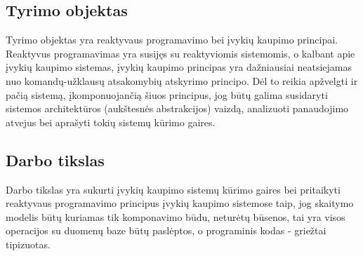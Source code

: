 \subsection{Tyrimo objektas}

    Tyrimo objektas yra reaktyvaus programavimo bei įvykių kaupimo principai. Reaktyvus programavimas yra susijęs su reaktyviomis sistemomis, o kalbant apie įvykių kaupimo sistemas, įvykių kaupimo principas yra dažniausiai neatsiejamas nuo komandų-užklausų atsakomybių atskyrimo principo. Dėl to reikia apžvelgti ir pačią sistemą, įkomponuojančią šiuos principus, jog būtų galima susidaryti sistemos architektūros (aukštesnės abstrakcijos) vaizdą, analizuoti panaudojimo atvejus bei aprašyti tokių sistemų kūrimo gaires.

\subsection{Darbo tikslas}

  Darbo tikslas yra sukurti įvykių kaupimo sistemų kūrimo gaires bei pritaikyti reaktyvaus programavimo principus įvykių kaupimo sistemose taip, jog skaitymo modelis būtų kuriamas tik komponavimo būdu, neturėtų būsenos, tai yra visos operacijos su duomenų baze būtų paslėptos, o programinis kodas - griežtai tipizuotas.








